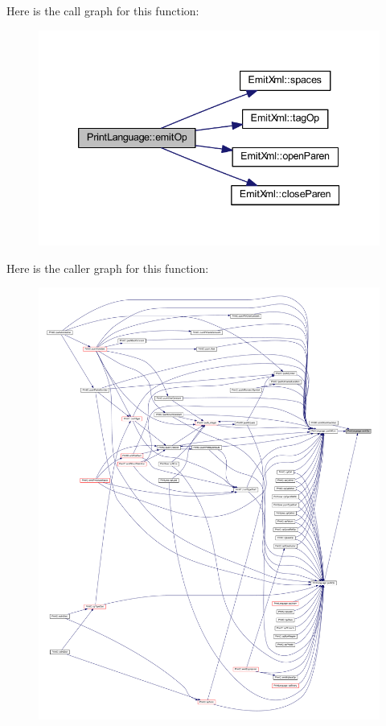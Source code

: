 Here is the call graph for this function\+:
\nopagebreak
\begin{figure}[H]
\begin{center}
\leavevmode
\includegraphics[width=339pt]{class_print_language_a61cfb2515689f57d3d3b5895b52ef078_cgraph}
\end{center}
\end{figure}
Here is the caller graph for this function\+:
\nopagebreak
\begin{figure}[H]
\begin{center}
\leavevmode
\includegraphics[width=350pt]{class_print_language_a61cfb2515689f57d3d3b5895b52ef078_icgraph}
\end{center}
\end{figure}
\mbox{\label{class_print_language_a84affe778545c950190a9d7d3edbf6e5}} 
